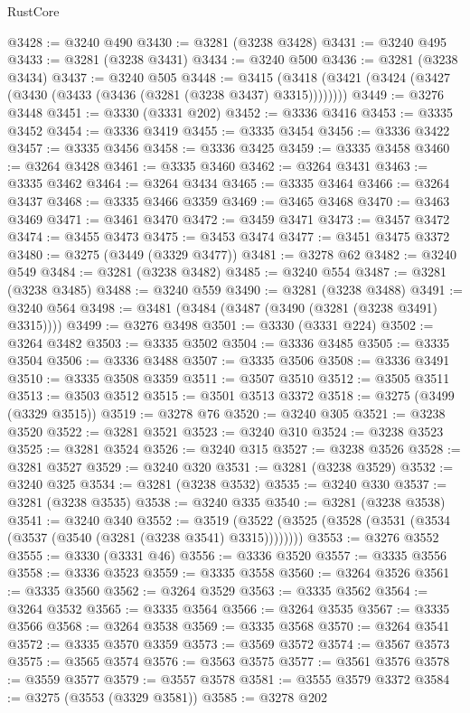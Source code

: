 \begin{lexlean}{RustCore}
\begin{coremodule}
@3428 := @3240 @490
@3430 := @3281 (@3238 @3428)
@3431 := @3240 @495
@3433 := @3281 (@3238 @3431)
@3434 := @3240 @500
@3436 := @3281 (@3238 @3434)
@3437 := @3240 @505
@3448 := @3415 (@3418 (@3421 (@3424 (@3427 (@3430 (@3433 (@3436 (@3281 (@3238 @3437) @3315))))))))
@3449 := @3276 @3448
@3451 := @3330 (@3331 @202)
@3452 := @3336 @3416
@3453 := @3335 @3452
@3454 := @3336 @3419
@3455 := @3335 @3454
@3456 := @3336 @3422
@3457 := @3335 @3456
@3458 := @3336 @3425
@3459 := @3335 @3458
@3460 := @3264 @3428
@3461 := @3335 @3460
@3462 := @3264 @3431
@3463 := @3335 @3462
@3464 := @3264 @3434
@3465 := @3335 @3464
@3466 := @3264 @3437
@3468 := @3335 @3466 @3359
@3469 := @3465 @3468
@3470 := @3463 @3469
@3471 := @3461 @3470
@3472 := @3459 @3471
@3473 := @3457 @3472
@3474 := @3455 @3473
@3475 := @3453 @3474
@3477 := @3451 @3475 @3372
@3480 := @3275 (@3449 (@3329 @3477))
@3481 := @3278 @62
@3482 := @3240 @549
@3484 := @3281 (@3238 @3482)
@3485 := @3240 @554
@3487 := @3281 (@3238 @3485)
@3488 := @3240 @559
@3490 := @3281 (@3238 @3488)
@3491 := @3240 @564
@3498 := @3481 (@3484 (@3487 (@3490 (@3281 (@3238 @3491) @3315))))
@3499 := @3276 @3498
@3501 := @3330 (@3331 @224)
@3502 := @3264 @3482
@3503 := @3335 @3502
@3504 := @3336 @3485
@3505 := @3335 @3504
@3506 := @3336 @3488
@3507 := @3335 @3506
@3508 := @3336 @3491
@3510 := @3335 @3508 @3359
@3511 := @3507 @3510
@3512 := @3505 @3511
@3513 := @3503 @3512
@3515 := @3501 @3513 @3372
@3518 := @3275 (@3499 (@3329 @3515))
@3519 := @3278 @76
@3520 := @3240 @305
@3521 := @3238 @3520
@3522 := @3281 @3521
@3523 := @3240 @310
@3524 := @3238 @3523
@3525 := @3281 @3524
@3526 := @3240 @315
@3527 := @3238 @3526
@3528 := @3281 @3527
@3529 := @3240 @320
@3531 := @3281 (@3238 @3529)
@3532 := @3240 @325
@3534 := @3281 (@3238 @3532)
@3535 := @3240 @330
@3537 := @3281 (@3238 @3535)
@3538 := @3240 @335
@3540 := @3281 (@3238 @3538)
@3541 := @3240 @340
@3552 := @3519 (@3522 (@3525 (@3528 (@3531 (@3534 (@3537 (@3540 (@3281 (@3238 @3541) @3315))))))))
@3553 := @3276 @3552
@3555 := @3330 (@3331 @46)
@3556 := @3336 @3520
@3557 := @3335 @3556
@3558 := @3336 @3523
@3559 := @3335 @3558
@3560 := @3264 @3526
@3561 := @3335 @3560
@3562 := @3264 @3529
@3563 := @3335 @3562
@3564 := @3264 @3532
@3565 := @3335 @3564
@3566 := @3264 @3535
@3567 := @3335 @3566
@3568 := @3264 @3538
@3569 := @3335 @3568
@3570 := @3264 @3541
@3572 := @3335 @3570 @3359
@3573 := @3569 @3572
@3574 := @3567 @3573
@3575 := @3565 @3574
@3576 := @3563 @3575
@3577 := @3561 @3576
@3578 := @3559 @3577
@3579 := @3557 @3578
@3581 := @3555 @3579 @3372
@3584 := @3275 (@3553 (@3329 @3581))
@3585 := @3278 @202

\end{coremodule}
\end{lexlean}
